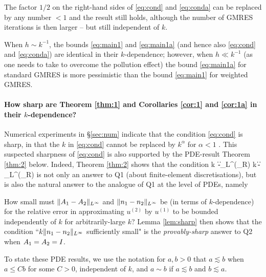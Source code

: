 The factor $1/2$ on the right-hand sides of \eqref{eq:cond} and \eqref{eq:conda} can be replaced by any number $<1$ and the result still holds, although the number of GMRES iterations is then larger -- but still independent of $k$.

\bre
When $h\sim  k^{-1}$, the bounds \eqref{eq:main1} and \eqref{eq:main1a} (and hence also \eqref{eq:cond} and \eqref{eq:conda}) are identical in their $k$-dependence; however, when $h\ll k^{-1}$ (as one needs to take to overcome the pollution effect) the bound \eqref{eq:main1a} for standard GMRES is more pessimistic than the bound \eqref{eq:main1} for weighted GMRES.
\ere


\paragraph{How sharp are Theorem \ref{thm:1} and Corollaries \ref{cor:1} and \ref{cor:1a} in their $k$-dependence?}
Numerical experiments in \S\ref{sec:num} indicate that the condition \eqref{eq:cond} is sharp, in that the $k$ in \eqref{eq:cond} cannot be replaced by $k^\alpha$ for $\alpha<1$ . This suspected sharpness of \eqref{eq:cond} is also supported by the PDE-result Theorem \ref{thm:2} below. Indeed, Theorem \ref{thm:2} %
 shows that the condition
\beqs
k\,
\big\|\Ao-\At\big\|_{L^\infty(\Omega_R)} \quad{} \quad k\,\big\|\no-\nt\big\|_{L^\infty(\Omega_R)}
\quad{}
\eeqs
is not only an answer to Q1 (about finite-element discretisations), but is also the natural answer to the analogue of Q1 at the level of PDEs, namely 
\bit
\item[Q2.]
How small must $\|A_{1} - A_{2}\|_{L^\infty}$ and 
$\|n_{1} - n_{2}\|_{L^\infty}$ be (in terms of $k$-dependence) for the relative error in approximating 
$u^{(2)}$ by $u^{(1)}$ to be bounded independently of $k$ for arbitrarily-large $k$? 
\eit
Lemma \ref{lem:sharp} then shows that the condition ``$k\|n_{1} - n_{2}\|_{L^\infty}$ sufficiently small" is the \emph{provably-sharp} answer to Q2 when $A_{1}= A_{2}= I$.

To state these PDE results, we use the notation for $a,b>0$ that $a\lesssim b$ when $a\leq C b$ for some $C>0$, independent of $k$, and $a\sim b$ if $a\lesssim b$ and $b\lesssim a$.


